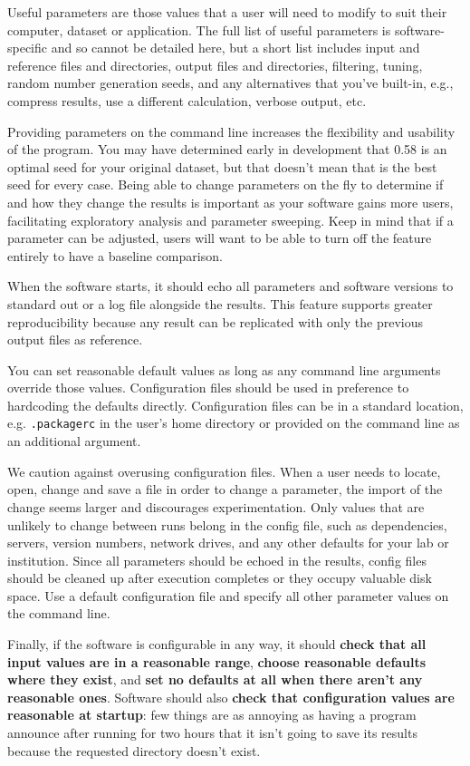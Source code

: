 \documentclass[10pt,letterpaper]{article}
\begin{document}
Useful parameters are those values that a user will need to modify to suit
their computer, dataset or application. 
The full list of useful parameters is software-specific and so cannot be
detailed here, but a short list includes
input and reference files and directories,
output files and directories,
filtering,
tuning,
random number generation seeds,
and
any alternatives that you've built-in,
e.g.,
compress results, use a different calculation, verbose output, etc.

Providing parameters on the
command line increases the flexibility and usability of the program. You
may have determined early in development that 0.58 is an optimal seed for your
original dataset, but that doesn't mean that is the best seed for every
case. Being able to change parameters on the fly to determine if and how
they change the results is important as your software gains more users,
facilitating exploratory analysis and parameter sweeping. Keep in mind
that if a parameter can be adjusted, users will want to be able to turn
off the feature entirely to have a baseline comparison.

When the software starts, it should echo all parameters and software
versions to standard out or a log file alongside the results. This
feature supports greater reproducibility because any result can be
replicated with only the previous output files as reference.

You can set reasonable default values
as long as any command line arguments
override those values. Configuration files should be used in preference
to hardcoding the defaults directly. Configuration files can be in a standard
location, e.g. \texttt{.packagerc} in the user's home directory or
provided on the command line as an additional argument.

We caution against overusing configuration files. When a user needs to
locate, open, change and save a file in order to change a parameter, the
import of the change seems larger and discourages experimentation. 
Only values that are unlikely to
change between runs belong in the config file, such as dependencies,
servers, version numbers, network drives, and any other defaults for
your lab or institution. 
Since
all parameters should be echoed in the results, config files should be
cleaned up after execution completes or they occupy valuable disk space.
Use a default configuration file and specify all other parameter values on the
command line.

Finally,
if the software is configurable in any way,
it should \textbf{check that all input values are in a reasonable range},
\textbf{choose reasonable defaults where they exist},
and \textbf{set no defaults at all when there aren't any reasonable ones}.
Software should also \textbf{check that configuration values are reasonable at startup}:
few things are as annoying as having a program announce after running for two hours
that it isn't going to save its results
because the requested directory doesn't exist.
\end{document}
